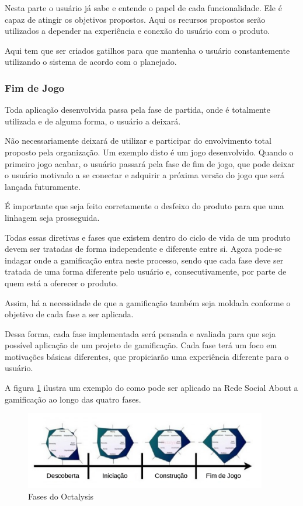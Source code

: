 Nesta parte o usuário já sabe e entende o papel de cada funcionalidade. Ele é capaz
de atingir os objetivos propostos. Aqui os recursos propostos serão utilizados
a depender na experiência e conexão do usuário com o produto.

Aqui tem que ser criados gatilhos para que mantenha o usuário constantemente utilizando
o sistema de acordo com o planejado.

\subsubsection{Fim de Jogo}
\label{sub:fim_de_jogo}
Toda aplicação desenvolvida passa pela fase de partida, onde é totalmente utilizada
e de alguma forma, o usuário a deixará.

Não necessariamente deixará de utilizar e participar do envolvimento total proposto pela
organização. Um exemplo disto é um jogo desenvolvido. Quando o primeiro jogo acabar, o
usuário passará pela fase de fim de jogo, que pode deixar o usuário motivado a se conectar
e adquirir a próxima versão do jogo que será lançada futuramente.

É importante que seja feito corretamente o desfeixo do produto para que uma linhagem seja
prosseguida.


Todas essas diretivas e fases que existem dentro do ciclo de vida de um produto
devem ser
tratadas de forma independente e diferente entre si. Agora pode-se indagar onde
a gamificação
entra neste processo, sendo que cada fase deve ser tratada de uma forma diferente pelo
usuário e, consecutivamente, por parte de quem está a oferecer o produto.

Assim, há a necessidade de que a gamificação também seja moldada conforme o objetivo de
cada fase a ser aplicada.

Dessa forma, cada fase implementada será pensada e avaliada para que seja possível
aplicação de um  projeto de gamificação. Cada fase terá um foco em motivações
básicas diferentes, que propiciarão uma experiência diferente para o usuário.

A figura \ref{fig:fasesoctalysis} ilustra um exemplo do como pode ser aplicado na
Rede Social About a gamificação ao longo das quatro fases.

\begin{figure}[h]
    \centering
    \includegraphics[width=400px, scale=1]{figuras/fasesoctalysis}
    \caption{Fases do Octalysis}
    \label{fig:fasesoctalysis}
\end{figure}

